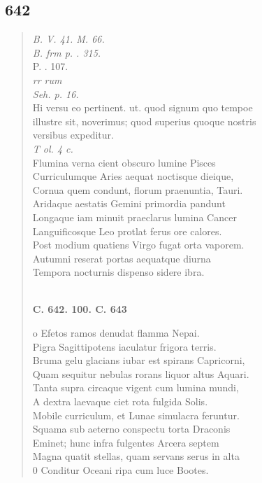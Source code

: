 \documentclass[11pt, a4paper]{report}
\begin{document}
            \subsection*{642}
      \begin{verse}
      \textit{B. V. 41. M. 66.} \\ \textit{B. frm p. . 315.} \\ P. . 107. \\ \textit{rr rum} \\ \textit{Seh. p. 16.} \\ Hi versu eo pertinent. ut. quod signum quo tempoe \\ illustre sit, noverimus; quod superius quoque nostris \\ versibus expeditur. \\ \textit{T ol. 4 c.} \\ Flumina verna cient obscuro lumine Pisces \\ Curriculumque Aries aequat noctisque dieique, \\ Cornua quem condunt, florum praenuntia, Tauri. \\ Aridaque aestatis Gemini primordia pandunt \\ Longaque iam minuit praeclarus lumina Cancer \\ Languificosque Leo protlat ferus ore calores. \\ Post modium quatiens Virgo fugat orta vaporem. \\ Autumni reserat portas aequatque diurna \\ Tempora nocturnis dispenso sidere ibra. \\ 
        ﻿\pagebreak 
    \begin{center} \textbf{C. 642. 100. C. 643} \end{center} \marginpar{[109]} o Efetos ramos denudat flamma Nepai. \\ Pigra Sagittipotens iaculatur frigora terris. \\ Bruma gelu glacians iubar est spirans Capricorni, \\ Quam sequitur nebulas rorans liquor altus Aquari. \\ Tanta supra circaque vigent cum lumina mundi, \\ A dextra laevaque ciet rota fulgida Solis. \\ Mobile curriculum, et Lunae simulacra feruntur. \\ Squama sub aeterno conspectu torta Draconis \\ Eminet; hunc infra fulgentes Arcera septem \\ Magna quatit stellas, quam servans serus in alta \\ 0 Conditur Oceani ripa cum luce Bootes. \\ 
      \end{verse}
  
\end{document}
